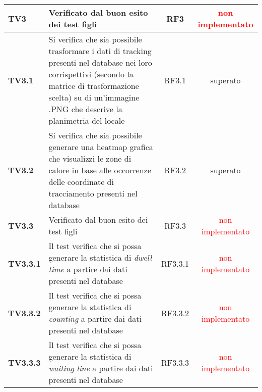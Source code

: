 \begin{center}
\begin{longtable}{ | l | p{5cm} | c | c |}
\textbf{TV3} & Verificato dal buon esito dei test figli & RF3 &  \textcolor{red}{non implementato}  \\ \hline 
\textbf{TV3.1} & Si verifica che sia possibile trasformare i dati di tracking presenti nel database nei loro corrispettivi (secondo la matrice di trasformazione scelta) su di un'immagine .PNG che descrive la planimetria del locale & RF3.1 &  \textcolor{green!80!blue}{superato}  \\ \hline 
\textbf{TV3.2} & Si verifica che sia possibile generare una heatmap grafica che visualizzi le zone di calore in base alle occorrenze delle coordinate di tracciamento presenti nel database & RF3.2 &  \textcolor{green!80!blue}{superato}  \\ \hline 
\textbf{TV3.3} & Verificato dal buon esito dei test figli & RF3.3 &  \textcolor{red}{non implementato}  \\ \hline 
\textbf{TV3.3.1} & Il test verifica che si possa generare la statistica di \textit{dwell time} a partire dai dati presenti nel database & RF3.3.1 &  \textcolor{red}{non implementato}  \\ \hline 
\textbf{TV3.3.2} & Il test verifica che si possa generare la statistica di \textit{counting} a partire dai dati presenti nel database & RF3.3.2 &  \textcolor{red}{non implementato}  \\ \hline 
\textbf{TV3.3.3} & Il test verifica che si possa generare la statistica di \textit{waiting line} a partire dai dati presenti nel database & RF3.3.3 &  \textcolor{red}{non implementato}  \\ \hline 
\end{longtable}
\end{center}
